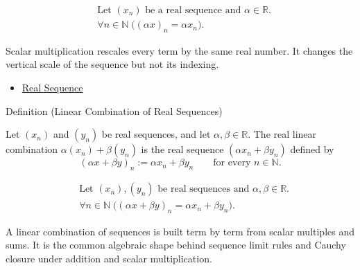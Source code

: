 \begin{remark*}
\[
\begin{aligned}
&\text{Let } (x_n) \text{ be a real sequence and } \alpha\in\mathbb{R}.\\
&\forall n\in\mathbb{N}\;\bigl((\alpha x)_n=\alpha x_n\bigr).
\end{aligned}
\]
\end{remark*}

\begin{remark*}[Interpretation]
Scalar multiplication rescales every term by the same real number. It changes
the vertical scale of the sequence but not its indexing.
\end{remark*}

\begin{dependencies}
\begin{itemize}
  \item \hyperref[def:real-sequence]{Real Sequence}
\end{itemize}
\end{dependencies}


\begin{definitionbox}{Definition (Linear Combination of Real Sequences)}
\begin{definition}
\label{def:linear-combination-of-real-sequences}
Let $(x_n)$ and $(y_n)$ be real sequences, and let
$\alpha,\beta\in\mathbb{R}$.  The real linear combination
$\alpha(x_n)+\beta(y_n)$ is the real sequence $(\alpha x_n+\beta y_n)$
defined by
\[
(\alpha x+\beta y)_n := \alpha x_n+\beta y_n
\qquad
\text{for every } n\in\mathbb{N}.
\]
\end{definition}
\end{definitionbox}

\begin{remark*}
\[
\begin{aligned}
&\text{Let } (x_n),(y_n) \text{ be real sequences and }
  \alpha,\beta\in\mathbb{R}.\\
&\forall n\in\mathbb{N}\;\bigl((\alpha x+\beta y)_n
  =\alpha x_n+\beta y_n\bigr).
\end{aligned}
\]
\end{remark*}

\begin{remark*}[Interpretation]
A linear combination of sequences is built term by term from scalar
multiples and sums. It is the common algebraic shape behind sequence limit
rules and Cauchy closure under addition and scalar multiplication.
\end{remark*}

